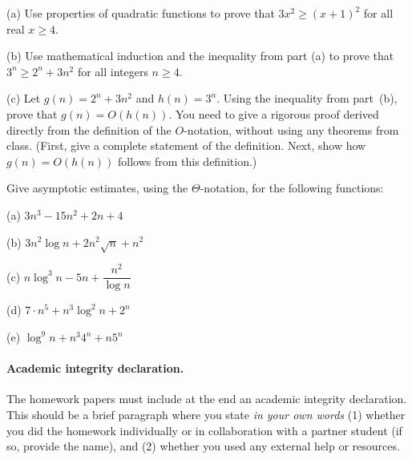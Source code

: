 \documentclass{article}
\begin{document}
\begin{problem} 

\smallskip
\noindent
(a) Use properties of quadratic functions to prove that $3x^2 \geq (x + 1)^
2$ for all real $x \ge 4$.

\smallskip
\noindent
(b) Use mathematical induction and the inequality from part (a) to prove that $3^n \ge 2^{n} + 3n^2$ for all integers $n\ge 4$.

\smallskip
\noindent
(c)
Let $g(n) =  2^{n} + 3n^2$ and $h(n) = 3^n$.
Using the inequality from part~(b), prove that $g(n) = O(h(n))$.
You need to give a rigorous proof derived directly from 
the definition of the $O$-notation, without using any theorems from class.
(First, give a complete statement of the definition. 
Next, show how $g(n) = O(h(n)) $ follows from this definition.)



\end{problem}



\begin{problem} 
Give asymptotic estimates, using the $\Theta$-notation, for the following functions:
%
\begin{description}\setlength{\itemsep}{-0.01in}
%
\item{(a)} $3n^3 - 15n^2 + 2n + 4$
\item{(b)} $3n^2\log n +  2n^2\sqrt{n} + n^2$
\item{(c)} $n\log^3n -5 n + \dfrac{n^2}{\log n}$
\item{(d)} $7 \cdot n^5 + n^3 \log^2 n + 2^n$
\item{(e)} $\log^{9}n + n^3 4^n + n 5^n$
%
\end{description}


\end{problem}

\paragraph{Academic integrity declaration.}
The homework papers must include at the end an academic integrity declaration. This should be a brief paragraph where you state
\emph{in your own words}  (1) whether you did the homework individually or in collaboration with a partner student (if so, provide the name), 
and (2) whether you used any external help or resources. 



\vspace{0.02in}
\end{document}
